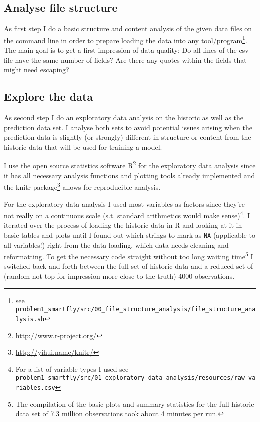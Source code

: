 \documentclass{article}
\begin{document}
\subsection{Analyse file structure} %
\label{sub:analyse_file_structure}
As first step I do a basic structure and content analysis of the given data files on the command line in order to prepare loading the data into any tool/program\footnote{see \verb+problem1_smartfly/src/00_file_structure_analysis/file_structure_analysis.sh+ }. The main goal is to get a first impression of data quality: Do all lines of the csv file have the same number of fields? Are there any quotes within the fields that might need escaping?




\subsection{Explore the data} %
\label{sub:explore_data}

As second step I do an exploratory data analysis on the historic as well as the prediction data set. I analyse both sets to avoid potential issues arising when the prediction data is slightly (or strongly) different in structure or content from the historic data that will be used for training a model. 

I use the open source statistics software R\footnote{\url{http://www.r-project.org/}} for the exploratory data analysis since it has all necessary analysis functions and plotting tools already implemented and the knitr package\footnote{\url{http://yihui.name/knitr/}} allows for reproducible analysis.

For the exploratory data analysis I used most variables as factors since they're not really on a continuous scale (s.t. standard arithmetics would make sense)\footnote{For a list of variable types I used see \verb+problem1_smartfly/src/01_exploratory_data_analysis/resources/raw_variables.csv+}.
I iterated over the process of loading the historic data in R and looking at it in basic tables and plots until I found out which strings to mark as \verb+NA+ (applicable to all variables!) right from the data loading, which data needs cleaning and reformatting. To get the necessary code straight without too long waiting time\footnote{The compilation of the basic plots and summary statistics for the full historic data set of 7.3 million observations took about 4 minutes per run.} I switched back and forth between the full set of historic data and a reduced set of (random not top for impression more close to the truth) 4000 observations.
\end{document}
